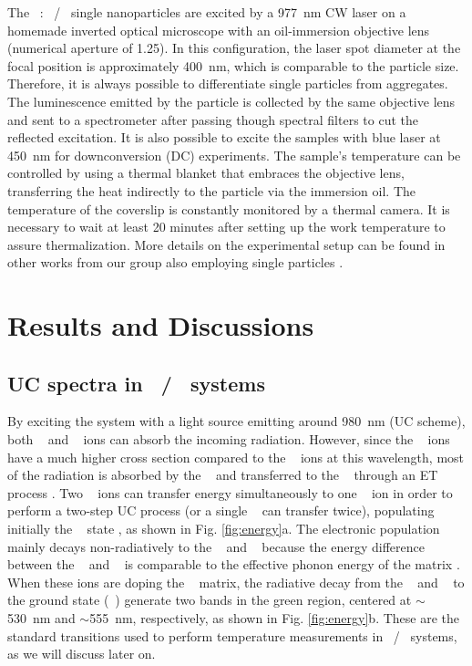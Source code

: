 \documentclass[journal=jacsat,manuscript=article, layout=twocolumn]{achemso}
\newcommand*\Yttria[1]{Y$_{2}$O$_{3}$}
\newcommand*\Yb[1]{Yb$^{3+}$}
\newcommand*\Er[1]{Er$^{3+}$}
\newcommand*\fourFseven[1]{$^4$F$_{7/2}$}
\newcommand*\twoHeleven[1]{$^2$H$_{11/2}$}
\newcommand*\fourSthree[1]{$^4$S$_{3/2}$}
\newcommand*\fourIfifteen[1]{$^4$I$_{15/2}$}
\begin{document}
The \Yttria~: \Yb~/\Er~ single nanoparticles are excited by a \SI{977}{\nano\meter} CW laser on a homemade inverted optical microscope with an oil-immersion objective lens (numerical aperture of 1.25). In this configuration, the laser spot diameter at the focal position is approximately \SI{400}{\nano\meter}, which is comparable to the particle size. Therefore, it is always possible to differentiate single particles from aggregates. The luminescence emitted by the particle is collected by the same objective lens and sent to a spectrometer after passing though spectral filters to cut the reflected excitation. It is also possible to excite the samples with blue laser at \SI{450}{\nano\meter} for downconversion (DC) experiments. The sample's temperature can be controlled by using a thermal blanket that embraces the objective lens, transferring the heat indirectly to the particle via the immersion oil. The temperature of the coverslip is constantly monitored by a thermal camera. It is necessary to wait at least 20 minutes after setting up the work temperature to assure thermalization. More details on the experimental setup can be found in other works from our group also employing single particles \cite{Goncalves_2021, Galindo_2021, Galindo_2021_corr, Galvao_2021}.

\section{Results and Discussions}{\label{sec:discussion}}
\subsection{UC spectra in \Yb~/\Er~ systems}{\label{subsec:temperature_measr}}

By exciting the system with a light source emitting around \SI{980}{\nano\meter} (UC scheme), both \Er~ and \Yb~ ions can absorb the incoming radiation. However, since the \Yb~ ions have a much higher cross section compared to the \Er~ ions at this wavelength, most of the radiation is absorbed by the \Yb~ and transferred to the \Er~ through an ET process \cite{Berry_2015}. Two \Yb~ ions can transfer energy simultaneously to one \Er~ ion in order to perform a two-step UC process (or a single \Yb~ can transfer twice), populating initially the \fourFseven~ state \cite{Goncalves_2021}, as shown in Fig. \ref{fig:energy}a. The electronic population mainly decays non-radiatively to the \twoHeleven~ and \fourSthree~ because the energy difference between the \fourFseven~ and \twoHeleven~ is comparable to the effective phonon energy of the matrix \cite{Dechao_2016}. When these ions are doping the \Yttria~ matrix, the radiative decay from the \twoHeleven~ and \fourSthree~ to the ground state (\fourIfifteen~) generate two bands in the green region, centered at $\sim$\SI{530}{\nano\meter} and $\sim$\SI{555}{\nano\meter}, respectively, as shown in Fig. \ref{fig:energy}b. These are the standard transitions used to perform temperature measurements in \Yb~/\Er~ systems, as we will discuss later on.
\end{document}
